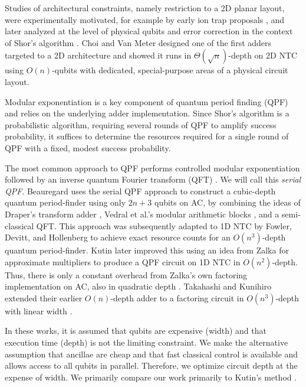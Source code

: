 \documentclass[twoside]{article}
\begin{document}
Studies of architectural constraints, namely restriction to a 2D planar layout, 
were experimentally motivated, for example by early ion trap proposals \cite{Kielpinski2002}, 
and later analyzed at the level of physical qubits and error correction in the context of Shor's algorithm \cite{Kubi09}.
Choi and Van Meter designed one of the first adders targeted to a 2D architecture 
and showed it runs in $\Theta(\sqrt{n})$-depth on \textsc{2D NTC} \cite{Choi2010}
using $O(n)$-qubits with dedicated, special-purpose areas of a physical
circuit layout.

Modular exponentiation is a key component of quantum period finding (QPF) and relies on the underlying adder implementation.
Since Shor's algorithm is a probabilistic algorithm, requiring several rounds of
QPF to amplify success probability, it suffices to determine the resources
required for a single round of QPF with a fixed, modest success probability.

The most common approach to QPF performs controlled
modular exponentiation followed by an inverse quantum Fourier transform
(QFT) \cite{Nielsen2000}. We will call this \emph{serial QPF}.
Beauregard \cite{Beauregard2002} uses the serial QPF approach
to construct a cubic-depth quantum period-finder using only $2n+3$ qubits on AC,
by combining the ideas of Draper's transform adder \cite{Draper2000},
Vedral et al.'s modular arithmetic blocks \cite{Vedral1996}, and a
semi-classical QFT.
This approach was subsequently adapted to \textsc{1D NTC} by Fowler, Devitt,
and Hollenberg
\cite{Fowler2004} to achieve exact resource counts for an $O(n^3)$-depth
quantum period-finder. Kutin \cite{Kutin2006} later improved this using
an idea from Zalka for approximate multipliers to produce a QPF circuit on
\textsc{1D NTC}
in $O(n^2)$-depth. Thus, there is only a constant overhead from
Zalka's own factoring implementation on \textsc{AC}, also in quadratic depth
\cite{Zalka1998}.
Takahashi and Kunihiro extended their earlier $O(n)$-depth adder to a factoring
circuit in $O(n^3)$-depth with linear width \cite{Takahashi2006}.

In these works, it is assumed that qubits are expensive (width) and that
execution time (depth) is not the limiting constraint.
We make the alternative assumption that ancillae are cheap and that fast classical control
is available and allows access to all qubits in parallel. 
Therefore, we optimize circuit depth at the expense of width.
We primarily compare our work primarily to Kutin's method \cite{Kutin2006}.
\end{document}
